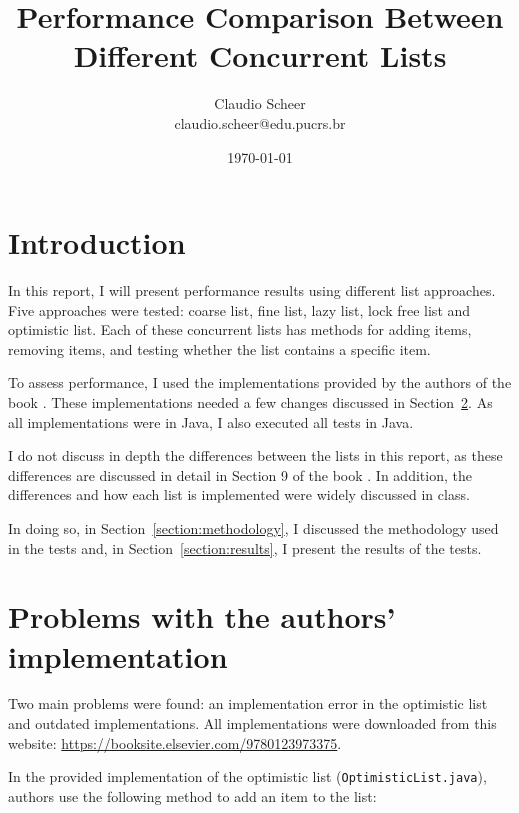\documentclass{article}
\title{Performance Comparison Between Different Concurrent Lists}
\author{
    Claudio Scheer\\
    claudio.scheer@edu.pucrs.br
}
\date{\today}
\begin{document}
\maketitle

\section{Introduction}

In this report, I will present performance results using different list approaches. Five approaches were tested: coarse list, fine list, lazy list, lock free list and optimistic list. Each of these concurrent lists has methods for adding items, removing items, and testing whether the list contains a specific item.

To assess performance, I used the implementations provided by the authors of the book \cite{DBLP:books/daglib/0020056}. These implementations needed a few changes discussed in Section~\ref{section:list_problems}. As all implementations were in Java, I also executed all tests in Java.

I do not discuss in depth the differences between the lists in this report, as these differences are discussed in detail in Section 9 of the book \cite{DBLP:books/daglib/0020056}. In addition, the differences and how each list is implemented were widely discussed in class.

In doing so, in Section~\ref{section:methodology}, I discussed the methodology used in the tests and, in Section~\ref{section:results}, I present the results of the tests.


\section{Problems with the authors' implementation} \label{section:list_problems}

Two main problems were found: an implementation error in the optimistic list and outdated implementations. All implementations were downloaded from this website: \url{https://booksite.elsevier.com/9780123973375}.

In the provided implementation of the optimistic list (\texttt{OptimisticList.java}), authors use the following method to add an item to the list:
\end{document}
